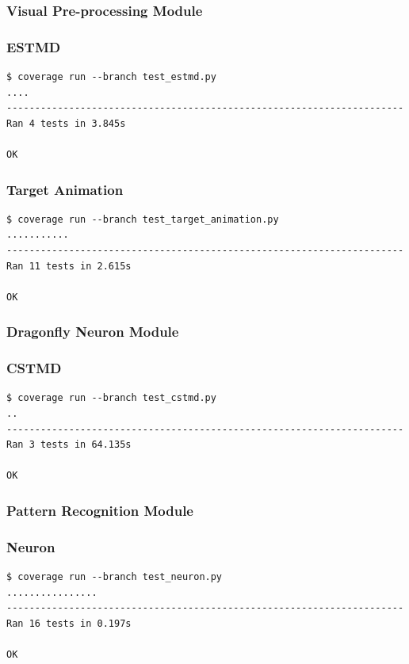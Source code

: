 \documentclass[a4paper,11pt]{article}
\begin{document}
\begin{appendices}
\subsubsection{Visual Pre-processing Module}
\subsubsection*{ESTMD}
\begin{verbatim}
$ coverage run --branch test_estmd.py
....
----------------------------------------------------------------------
Ran 4 tests in 3.845s

OK
\end{verbatim}
\subsubsection*{Target Animation}
\begin{verbatim}
$ coverage run --branch test_target_animation.py
...........
----------------------------------------------------------------------
Ran 11 tests in 2.615s

OK
\end{verbatim}

\subsubsection{Dragonfly Neuron Module}
\subsubsection*{CSTMD}
\begin{verbatim}
$ coverage run --branch test_cstmd.py
..
----------------------------------------------------------------------
Ran 3 tests in 64.135s

OK
\end{verbatim}

\subsubsection{Pattern Recognition Module}
\subsubsection*{Neuron}
\begin{verbatim}
$ coverage run --branch test_neuron.py
................
----------------------------------------------------------------------
Ran 16 tests in 0.197s

OK
\end{verbatim}


\end{appendices}
\end{document}
